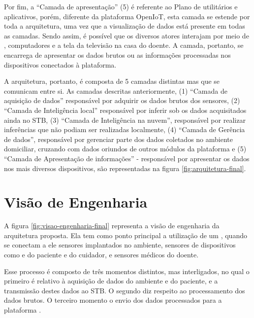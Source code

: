 
Por fim, a ``Camada de apresentação'' (5) é referente ao Plano de utilitários e
aplicativos, porém, diferente da plataforma OpenIoT, esta camada se estende por
toda a arquitetura, uma vez que a visualização de dados está presente em todas 
as camadas. Sendo assim, é possível que os diversos atores interajam por meio de
\smartphones, computadores e a tela da televisão na casa do doente.
A camada, portanto, se encarrega de apresentar os dados brutos ou as informações
processadas nos dispositivos conectados à plataforma. 

A arquitetura, portanto, é composta de 5 camadas distintas mas que se comunicam
entre si. As camadas descritas anteriormente, (1) ``Camada de aquisição de
dados'' responsável por adquirir os dados brutos dos sensores, (2) ``Camada de
Inteligência local'' responsável por inferir sob os dados acquisitados ainda no
STB, (3) ``Camada de Inteligência na nuvem'', responsável por realizar
inferências que não podiam ser realizadas localmente, (4) ``Camada de Gerência
de dados'', responsável por gerenciar parte dos dados coletados no ambiente
domiciliar, cruzando com dados oriundos de outros módulos da plataforma
\nextsaude[] e (5) ``Camada de Apresentação de informações'' - responsável por
apresentar os dados nos mais diversos dispositivos, são representadas na figura
\ref{fig:arquitetura-final}.


\section{Visão de Engenharia} \label{sec:visao-engenharia}

A figura \ref{fig:visao-engenharia-final} representa a visão de engenharia da arquitetura
proposta. Ela tem como ponto principal a utilização de um \stb[], quando se
conectam a ele sensores  implantados no ambiente, sensores de dispositivos como
\smartphones[] e  \smartwatches[] do paciente e do cuidador, e sensores médicos
do doente.

Esse processo é composto de três momentos distintos, mas  interligados, no qual
o primeiro é relativo à aquisição de dados do ambiente e do paciente, e a
transmissão destes dados ao STB. O segundo diz respeito ao processamento dos
dados brutos. O terceiro momento o envio dos dados processados para a plataforma
\nextsaude[].

